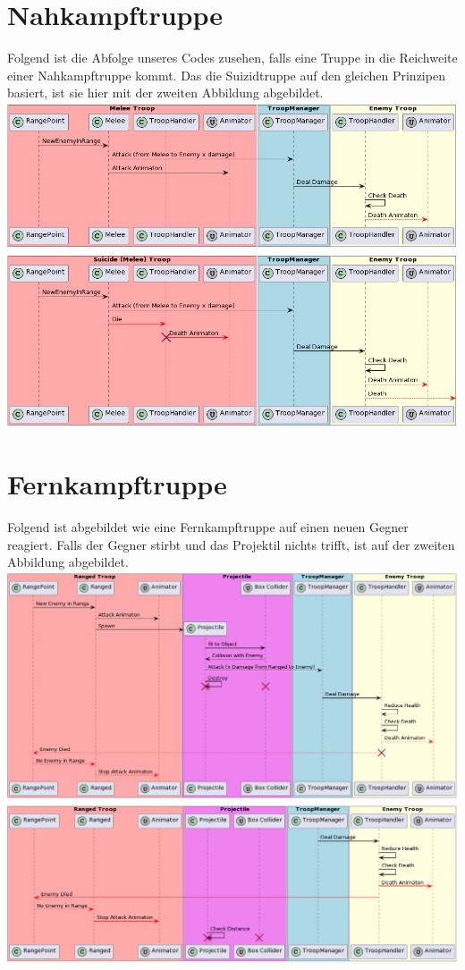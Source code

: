 \section{Nahkampftruppe}
Folgend ist die Abfolge unseres Codes zusehen, falls eine Truppe in die Reichweite einer Nahkampftruppe kommt.
Das die Suizidtruppe auf den gleichen Prinzipen basiert, ist sie hier mit der zweiten Abbildung abgebildet. \\
\includegraphics[width=15cm]{resources/MeleeAttacks.png} \\
\includegraphics[width=15cm]{resources/SuicideAttacks.png} \\

\section{Fernkampftruppe}
Folgend ist abgebildet wie eine Fernkampftruppe auf einen neuen Gegner reagiert.
Falls der Gegner stirbt und das Projektil nichts trifft, ist auf der zweiten Abbildung abgebildet.
\includegraphics[width=15cm]{resources/RangedAttacks.png} \\
\includegraphics[width=15cm]{resources/Projectile.png}

